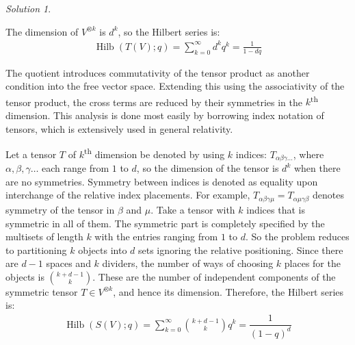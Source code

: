 \documentclass[svgnames]{article}
\theoremstyle{definition}
\theoremstyle{remark}
\newtheorem*{Solution*}{Solution}
\theoremstyle{underline}
\theoremstyle{underline}
\DeclareMathOperator{\Hilb}{Hilb}
\renewcommand{\th}{\textsuperscript{th}\xspace}
\begin{document}
	\begin{Solution*}
		\begin{subquests}
			\item The dimension of $V^{\otimes k}$ is $d^k$, so the Hilbert series is:
			\begin{gather*}
				\Hilb(T(V);q) = \sum_{k=0}^{\infty}d^k q^k = \frac{1}{1-dq}
			\end{gather*}
			
			\item The quotient introduces commutativity of the tensor product as another condition into the free vector space. Extending this using the associativity of the tensor product, the cross terms are reduced by their symmetries in the $k$\th dimension. This analysis is done most easily by borrowing index notation of tensors, which is extensively used in general relativity.

			Let a tensor $T$ of $k$\th dimension be denoted by using $k$ indices: $T_{\alpha\beta\gamma\dots}$, where $\alpha,\beta,\gamma \dots$ each range from $1$ to $d$, so the dimension of the tensor is $d^k$ when there are no symmetries. Symmetry between indices is denoted as equality upon interchange of the relative index placements. For example, $T_{\alpha\beta\gamma\mu} = T_{\alpha\mu\gamma\beta}$ denotes symmetry of the tensor in $\beta$ and $\mu$. Take a tensor with $k$ indices that is symmetric in all of them. The symmetric part is completely specified by the multisets of length $k$ with the entries ranging from $1$ to $d$. So the problem reduces to partitioning $k$ objects into $d$ sets ignoring the relative positioning. Since there are $d-1$ spaces and $k$ dividers, the number of ways of choosing $k$ places for the objects is $\binom{k+d-1}{k}$. These are the number of independent components of the symmetric tensor $T \in V^{\otimes k}$, and hence its dimension. Therefore, the Hilbert series is:
			\begin{gather*}
				\Hilb(S(V);q) = \sum_{k=0}^{\infty} \binom{k+d-1}{k} q^k = \dfrac 1 {(1 - q)^d}
			\end{gather*}


\end{subquests}
\end{Solution*}
\end{document}
